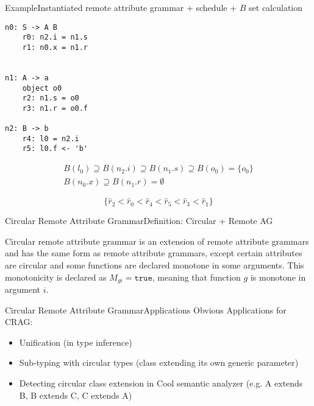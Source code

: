 \begin{frame}[fragile=singleslide]{Example}{Instantiated remote attribute grammar + schedule + $B$ set calculation}

\begin{multicols}{3}
\begin{Verbatim}[fontsize=\small]
n0: S -> A B
    r0: n2.i = n1.s
    r1: n0.x = n1.r


n1: A -> a
    object o0
    r2: n1.s = o0
    r3: n1.r = o0.f
    
n2: B -> b
    r4: l0 = n2.i
    r5: l0.f <- 'b'

\end{Verbatim}
\end{multicols}

\begin{equation}\label{eq:b-set-rag}
  \begin{gathered}
B(l_0) \supseteq B(n_2.i) \supseteq B(n_1.s) \supseteq B(o_0) = \{ o_0 \} \\
B(n_0.x) \supseteq B(n_1.r) = \emptyset
  \end{gathered}
\end{equation}


\begin{equation}\label{eq:remote-ag-schedule}
   \Big \{ \hat{r}_2 < \hat{r}_0 < \hat{r}_4 < \hat{r}_5 < \hat{r}_3 < \hat{r}_1 \Big \}
\end{equation}


\end{frame}



\begin{frame}{Circular Remote Attribute Grammar}{Definition: Circular + Remote AG}

\begin{definition}
Circular remote attribute grammar is an \alert{extension of remote attribute grammars} and has the same form as remote attribute grammars, except \alert{certain attributes are circular} and \alert{some functions are declared monotone in some arguments}. This monotonicity is declared as $M_{gi} = \texttt{true}$, meaning that function $g$ is monotone in argument $i$.
\end{definition}
\end{frame}


\begin{frame}{Circular Remote Attribute Grammar}{Applications}
Obvious Applications for CRAG:

\begin{itemize}
    \item Unification (in type inference)
	\item Sub-typing with circular types (class extending its own generic parameter)
	\item Detecting circular class extension in Cool semantic analyzer (e.g. A extends B, B extends C, C extends A)
\end{itemize}
\end{frame}


